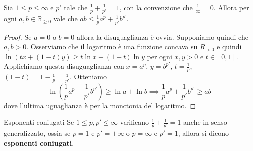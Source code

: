 \begin{proposition}\label{prp:Young}
    Sia \(1 \le p \le \infty\) e \(p'\) tale che \(\frac{1}{p} + \frac{1}{p'} =
    1\), con la convenzione che \(\frac{1}{\infty} = 0\). Allora per ogni \(a,
    b \in \mathbb{R}_{\ge 0} \) vale che \(ab \le \frac{1}{p} a^{p}
    +\frac{1}{p'} b^{p'}\).
\end{proposition}
\begin{proof}
    Se \(a=0\) o \(b=0\) allora la disuguaglianza è ovvia. Supponiamo quindi che
    \(a, b > 0\). Osserviamo che il logaritmo è una funzione concava su \(R_{>0}
    \) e quindi \(\ln(tx + (1-t)y) \ge t \ln x + (1-t) \ln y\) per ogni \(x, y >
    0\) e \(t \in [0, 1]\). Applichiamo questa disuguaglianza con \(x = a^{p}\),
    \(y = b^{p'}\), \(t = \frac{1}{p}\), \((1-t) = 1 - \frac{1}{p} =
    \frac{1}{p'}\). Otteniamo
    \[
        \ln\left(\frac{1}{p} a^{p} + \frac{1}{p'} b^{p'}\right) \ge \ln a + \ln b \implies
        \frac{1}{p} a^{p} + \frac{1}{p'} b^{p'} \ge ab
    \]
    dove l'ultima uguaglianza è per la monotonia del logaritmo.
\end{proof}

\begin{definition}[label=def:coniugati]{Esponenti coniugati}
    Se \(1 \le p, p' \le \infty\) verificano \(\frac{1}{p} + \frac{1}{p'} = 1\)
    anche in senso generalizzato, ossia se \(p = 1\) e \(p' = +\infty\) o \(p =
    \infty \) e \(p' = 1\), allora si dicono \textbf{esponenti coniugati}.
\end{definition}

